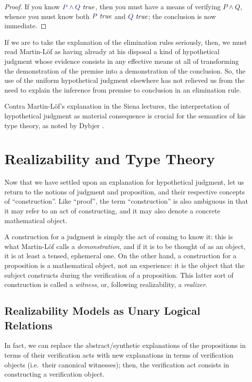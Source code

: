 \documentclass[11pt]{amsart}
\theoremstyle{definition}
\theoremstyle{remark}
\numberwithin{equation}{section}
\def\InputModeColorName{MidnightBlue}
\newcommand\InputMode[1]{{\color{\InputModeColorName}{#1}}}
\newcommand\IsTrue[1]{\InputMode{#1}\ \mathit{true}}
\begin{document}
\begin{proof}
If you know $\IsTrue{P\land Q}$, then you must have a means of verifying $P\land
Q$, whence you must know both $\IsTrue{P}$ and $\IsTrue{Q}$; the conclusion is
now immediate.
\end{proof}

If we are to take the explanation of the elimination rules seriously, then, we
must read Martin-L\"of as having already at his disposal a kind of hypothetical
judgment whose evidence consists in any effective means at all of transforming
the demonstration of the premise into a demonstration of the conclusion. So, the
use of the uniform hypothetical judgment elsewhere has not relieved us from the
need to explain the inference from premise to conclusion in an elimination rule.

Contra Martin-L\"of's explanation in the Siena lectures, the interpretation of
hypothetical judgment as material consequence is crucial for the semantics of
his type theory, as noted by Dybjer \cite{dybjer:testing}.

\section{Realizability and Type Theory}

Now that we have settled upon an explanation for hypothetical judgment, let us
return to the notions of judgment and proposition, and their respective concepts
of ``construction''. Like ``proof'', the term ``construction'' is also ambiguous
in that it may refer to an act of constructing, and it may also denote a
concrete mathematical object.

A construction for a judgment is simply the act of coming to know it: this is
what Martin-L\"of calls a \emph{demonstration}, and if it is to be thought of as
an object, it is at least a tensed, ephemeral one. On the other hand, a
construction for a proposition is a mathematical object, not an experience: it
is the object that the subject constructs during the verification of a
proposition. This latter sort of construction is called a \emph{witness}, or,
following realizability, a \emph{realizer}.

\subsection{Realizability Models as Unary Logical Relations}

In fact, we can replace the abstract/synthetic explanations of the propositions
in terms of their verification acts with new explanations in terms of
verification objects (i.e.\ their canonical witnesses); then, the verification
act consists in constructing a verification object.
\end{document}
